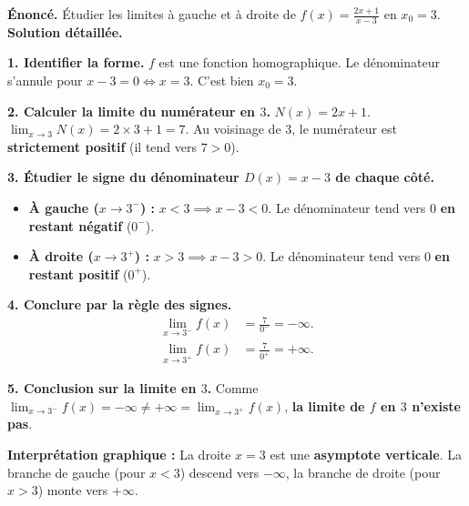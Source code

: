 \documentclass[11pt]{article}
\begin{document}
\begin{exoresolu}[Exemple type Probatoire : $f(x) = \frac{2x+1}{x-3}$ en $x_0 = 3$]
\textbf{Énoncé.} Étudier les limites à gauche et à droite de $f(x) = \frac{2x+1}{x-3}$ en $x_0 = 3$.
\tcblower
\textbf{Solution détaillée.}

\textbf{1. Identifier la forme.}
$f$ est une fonction homographique. Le dénominateur s'annule pour $x-3=0 \iff x=3$. C'est bien $x_0 = 3$.

\textbf{2. Calculer la limite du numérateur en $3$.}
$N(x) = 2x+1$. $\lim_{x \to 3} N(x) = 2\times 3 + 1 = 7$.
Au voisinage de $3$, le numérateur est \textbf{strictement positif} (il tend vers $7 > 0$).

\textbf{3. Étudier le signe du dénominateur $D(x) = x-3$ de chaque côté.}
\begin{itemize}
    \item \textbf{À gauche ($x \to 3^-$) :} $x < 3 \implies x-3 < 0$. Le dénominateur tend vers $0$ \textbf{en restant négatif} ($0^-$).
    \item \textbf{À droite ($x \to 3^+$) :} $x > 3 \implies x-3 > 0$. Le dénominateur tend vers $0$ \textbf{en restant positif} ($0^+$).
\end{itemize}

\textbf{4. Conclure par la règle des signes.}
\begin{align*}
\lim_{x \to 3^-} f(x) &= \frac{7}{0^-} = -\infty. \\
\lim_{x \to 3^+} f(x) &= \frac{7}{0^+} = +\infty.
\end{align*}

\textbf{5. Conclusion sur la limite en $3$.}
Comme $\lim_{x \to 3^-} f(x) = -\infty \neq +\infty = \lim_{x \to 3^+} f(x)$, \textbf{la limite de $f$ en $3$ n'existe pas}.

\textbf{Interprétation graphique :} La droite $x=3$ est une \textbf{asymptote verticale}. La branche de gauche (pour $x<3$) descend vers $-\infty$, la branche de droite (pour $x>3$) monte vers $+\infty$.
\end{exoresolu}
\end{document}
